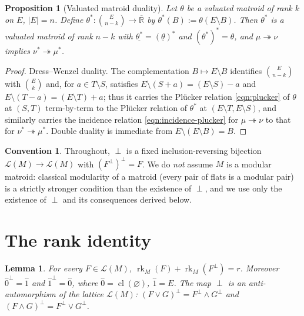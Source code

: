 \documentclass{article}
\newtheorem{proposition}[theorem]{Proposition}
\newtheorem{lemma}[theorem]{Lemma}
\theoremstyle{definition}
\newtheorem{convention}[theorem]{Convention}
\newcommand{\Rbar}{\overline{\mathbb{R}}}
\newcommand{\rk}{\operatorname{rk}}
\newcommand{\cl}{\operatorname{cl}}
\newcommand{\onto}{\twoheadrightarrow}
\newcommand{\cLL}{\mathcal{L}}
\begin{document}
\begin{proposition}[Valuated matroid duality]\label{fact:dual}
Let $\theta$ be a valuated matroid of rank $k$ on $E$, $|E|=n$. Define
$\theta^{*}\colon\binom{E}{n-k}\to\Rbar$ by $\theta^{*}(B):=\theta(E\setminus B)$. Then $\theta^{*}$
is a valuated matroid of rank $n-k$ with $\underline{\theta^{*}}=(\underline\theta)^{*}$ and
$(\theta^{*})^{*}=\theta$, and $\mu\onto\nu$ implies $\nu^{*}\onto\mu^{*}$.
\end{proposition}

\begin{proof}
Dress--Wenzel duality. The complementation $B\mapsto E\setminus B$ identifies $\binom{E}{n-k}$ with
$\binom{E}{k}$ and, for $a\in T\setminus S$, satisfies $E\setminus(S+a)=(E\setminus S)-a$ and
$E\setminus(T-a)=(E\setminus T)+a$; thus it carries the Pl\"ucker relation \eqref{eqn:plucker} of
$\theta$ at $(S,T)$ term-by-term to the Pl\"ucker relation of $\theta^{*}$ at $(E\setminus
T,E\setminus S)$, and similarly carries the incidence relation \eqref{eqn:incidence-plucker} for
$\mu\onto\nu$ to that for $\nu^{*}\onto\mu^{*}$. Double duality is immediate from $E\setminus
(E\setminus B)=B$.
\end{proof}

\begin{convention}\label{conv:perp}
Throughout, $\perp$ is a fixed inclusion-reversing bijection $\cLL(M)\to\cLL(M)$ with
$(F^{\perp})^{\perp}=F$. We do \emph{not} assume $M$ is a modular matroid: classical modularity of a
matroid (every pair of flats is a modular pair) is a strictly stronger condition than the existence
of $\perp$, and we use only the existence of $\perp$ and its consequences derived below.
\end{convention}

\section{The rank identity}

\begin{lemma}\label{lem:rank}
For every $F\in\cLL(M)$, $\rk_M(F)+\rk_M(F^{\perp})=r$. Moreover $\hat0^{\perp}=\hat1$ and
$\hat1^{\perp}=\hat0$, where $\hat0=\cl(\varnothing)$, $\hat1=E$. The map $\perp$ is an
anti-automorphism of the lattice $\cLL(M)$: $(F\vee G)^{\perp}=F^{\perp}\wedge G^{\perp}$ and
$(F\wedge G)^{\perp}=F^{\perp}\vee G^{\perp}$.
\end{lemma}
\end{document}
